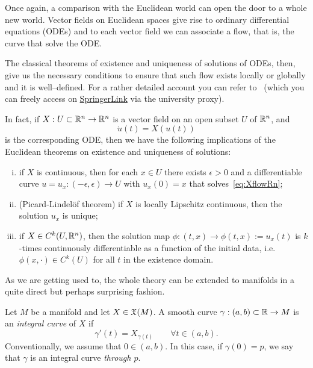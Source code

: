 Once again, a comparison with the Euclidean world can open the door to a whole new world.
Vector fields on Euclidean spaces give rise to ordinary differential equations (ODEs) and to each vector field we can associate a flow, that is, the curve that solve the ODE.

The classical theorems of existence and uniqueness of solutions of ODEs, then, give us the necessary conditions to ensure that such flow exists locally or globally and it is well--defined.
For a rather detailed account you can refer to~\cite[Chapters 3.2 and 3.3]{book:knauf} (which you can freely access on \href{https://link.springer.com/book/10.1007\%2F978-3-662-55774-7}{SpringerLink} via the university proxy).

In fact, if $X: U\subset\mathbb{R}^n \to \mathbb{R}^n$ is a vector field on an open subset $U$ of $\mathbb{R}^n$, and
\begin{equation}\label{eq:XflowRn}
	\dot u(t) = X(u(t))
\end{equation}
is the corresponding ODE, then we have the following implications of the Euclidean theorems on existence and uniqueness of solutions:
\begin{enumerate}[(i)]
	\item if $X$ is continuous, then for each $x\in U$ there exists $\epsilon > 0$ and a differentiable curve $u = u_{x} : (-\epsilon, \epsilon) \to U$ with $u_x(0) = x$ that solves~\eqref{eq:XflowRn};
	\item (Picard-Lindel\"of theorem) if $X$ is locally Lipschitz continuous, then the solution $u_x$ is unique;
	\item if $X\in C^k(U,\mathbb{R}^n)$, then the solution map $\phi : (t, x) \to \phi(t, x) := u_x (t)$ is $k$-times continuously differentiable as a function of the initial data, i.e. $\phi(x, \cdot)\in C^k(U)$ for all $t$ in the existence domain.
\end{enumerate}

As we are getting used to, the whole theory can be extended to manifolds in a quite direct but perhaps surprising fashion.

\begin{definition}
	Let $M$ be a manifold and let $X\in\mathfrak{X}(M)$.
	A smooth curve $\gamma: (a,b)\subset\mathbb{R} \to M$ is an \emph{integral curve} of $X$ if
	\begin{equation}\label{eq:integralCurve}
		\gamma'(t) = X_{\gamma(t)} \qquad \forall t\in(a,b).
	\end{equation}
	Conventionally, we assume that $0\in(a,b)$. In this case, if $\gamma(0)=p$, we say that $\gamma$ is an integral curve \emph{through $p$}.
\end{definition}

